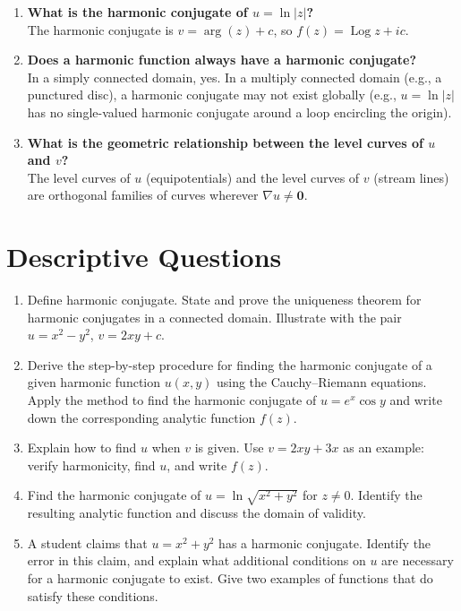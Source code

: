 \documentclass[12pt,a4paper]{article}
\begin{document}
\begin{enumerate}[label=\textbf{Q\arabic*.}]
\item \textbf{What is the harmonic conjugate of $u=\ln|z|$?}\\
      The harmonic conjugate is $v=\arg(z)+c$, so $f(z)=\operatorname{Log}z+ic$.

\item \textbf{Does a harmonic function always have a harmonic conjugate?}\\
      In a simply connected domain, yes. In a multiply connected domain (e.g., a
      punctured disc), a harmonic conjugate may not exist globally (e.g., $u=\ln|z|$
      has no single-valued harmonic conjugate around a loop encircling the origin).

\item \textbf{What is the geometric relationship between the level curves of $u$ and $v$?}\\
      The level curves of $u$ (equipotentials) and the level curves of $v$ (stream lines)
      are orthogonal families of curves wherever $\nabla u\neq\mathbf{0}$.

\end{enumerate}

\section{Descriptive Questions}

\begin{enumerate}[label=\textbf{D\arabic*.}]

\item Define harmonic conjugate. State and prove the uniqueness theorem for harmonic
      conjugates in a connected domain. Illustrate with the pair $u=x^2-y^2$,
      $v=2xy+c$.

\item Derive the step-by-step procedure for finding the harmonic conjugate of a given
      harmonic function $u(x,y)$ using the Cauchy--Riemann equations. Apply the method
      to find the harmonic conjugate of $u=e^x\cos y$ and write down the corresponding
      analytic function $f(z)$.

\item Explain how to find $u$ when $v$ is given. Use $v=2xy+3x$ as an example: verify
      harmonicity, find $u$, and write $f(z)$.

\item Find the harmonic conjugate of $u=\ln\sqrt{x^2+y^2}$ for $z\neq0$. Identify the
      resulting analytic function and discuss the domain of validity.

\item A student claims that $u=x^2+y^2$ has a harmonic conjugate. Identify the error
      in this claim, and explain what additional conditions on $u$ are necessary for a
      harmonic conjugate to exist. Give two examples of functions that do satisfy these
      conditions.

\end{enumerate}
\end{document}
